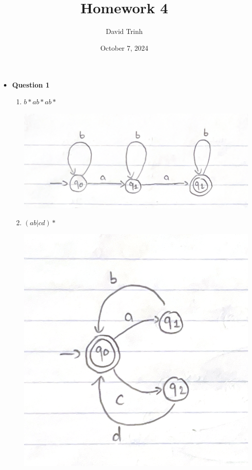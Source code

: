 \documentclass{article}
\title{Homework 4}
\author{David Trinh}
\date{October 7, 2024}
\begin{document}
\maketitle

\begin{itemize}

    \item\textbf{ Question 1}

    \begin{enumerate}
        \item $b*ab*ab*$

        \includegraphics[scale=0.2]{HW4_Q1_1.png}

        \item $(ab|cd)*$

        \includegraphics[scale=0.2]{HW4_Q1_2.png}


\end{enumerate}
\end{itemize}
\end{document}
